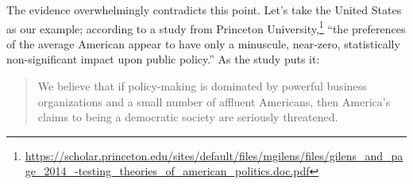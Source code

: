 The evidence overwhelmingly contradicts this point.
Let's take the United States as our example; according to a study from Princeton University,\footnote{\href{https://scholar.princeton.edu/sites/default/files/mgilens/files/gilens_and_page_2014_-testing_theories_of_american_politics.doc.pdf}{https://scholar.princeton.edu/sites/default/files/mgilens/files/gilens\_and\_page\_2014\_-testing\_theories\_of\_american\_politics.doc.pdf}} ``the preferences of the average American appear to have only a minuscule, near-zero, statistically non-significant impact upon public policy.''
As the study puts it:
\begin{quote}
We believe that if policy-making is dominated by powerful business organizations and a small number of affluent Americans, then America’s claims to being a democratic society are seriously threatened.
\end{quote}
%
%
%
%
%
%

